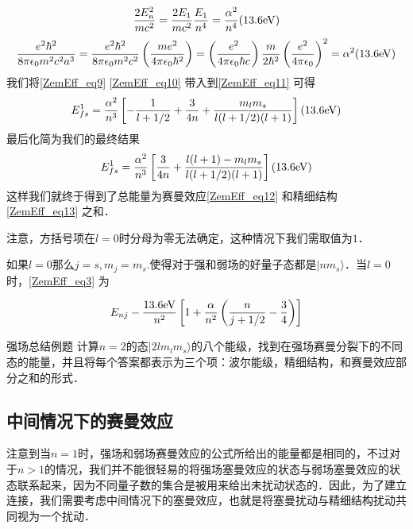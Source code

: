 \begin{equation}\label{ZemEff_eq10}
\frac{2E_n^2}{mc^2}=\frac{2E_1}{mc^2}\frac{E_1}{n^4}=\frac{\alpha^2}{n^4}(13.6\rm{eV})
\end{equation}
\begin{equation}
\frac{e^2\hbar^2}{8\pi\epsilon_0m^2c^2a^3}=\frac{e^2\hbar^2}{8\pi\epsilon_0m^2c^2}\left(\frac{me^2}{4\pi\epsilon_0\hbar^2}\right)=\left(\frac{e^2}{4\pi\epsilon_0\hbar c}\right)\frac{m}{2\hbar^2}\left(\frac{e^2}{4\pi\epsilon_0}\right)^2=\alpha^2(13.6\rm{eV})
\end{equation}
我们将\autoref{ZemEff_eq9} \autoref{ZemEff_eq10} 带入到\autoref{ZemEff_eq11} 可得
\begin{equation}\label{ZemEff_eq13}
E_{fs}^1=\frac{\alpha^2}{n^3}\left[-\frac{1}{l+1/2}+\frac{3}{4n}+\frac{m_lm_s}{l(l+1/2)(l+1)}\right](13.6 \rm eV) 
\end{equation}
最后化简为我们的最终结果
\begin{equation}
E_{fs}^1=\frac{\alpha^2}{n^3}\left[\frac{3}{4n}+\frac{l(l+1)-m_lm_s}{l(l+1/2)(l+1)}\right](13.6 \rm eV)
\end{equation}
这样我们就终于得到了总能量为赛曼效应\autoref{ZemEff_eq12} 和精细结构 \autoref{ZemEff_eq13} 之和．

注意，方括号项在$l=0$时分母为零无法确定，这种情况下我们需取值为$1$．
\begin{example}{}
如果$l=0$那么$j=s,m_j=m_s$.使得对于强和弱场的好量子态都是$|nm_s\rangle$．当$l=0$时，\autoref{ZemEff_eq3} 为

\begin{equation}
E_{nj}-\frac{13.6\rm{eV}}{n^2}\left[1+\frac{\alpha}{n^2}\left(\frac{n}{j+1/2}-\frac{3}{4}\right)\right]
\end{equation}

\end{example}

\begin{example}{强场总结例题}
计算$n=2$的态$|2lm_lm_s\rangle$的八个能级，找到在强场赛曼分裂下的不同态的能量，并且将每个答案都表示为三个项：波尔能级，精细结构，和赛曼效应部分之和的形式．

\end{example}
\subsection{中间情况下的赛曼效应}
注意到当$n=1$时，强场和弱场赛曼效应的公式所给出的能量都是相同的，不过对于$n > 1$的情况，我们并不能很轻易的将强场塞曼效应的状态与弱场塞曼效应的状态联系起来，因为不同量子数的集合是被用来给出未扰动状态的．因此，为了建立连接，我们需要考虑中间情况下的塞曼效应，也就是将塞曼扰动与精细结构扰动共同视为一个扰动．

